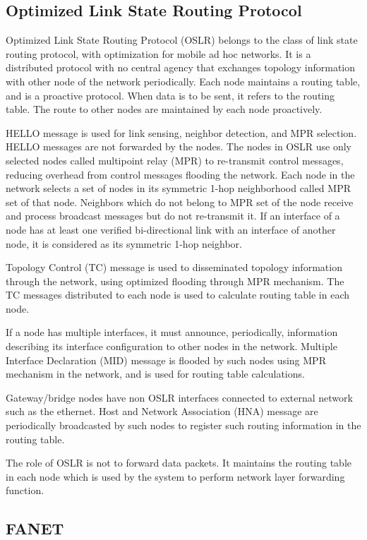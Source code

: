 \subsection{Optimized Link State Routing Protocol}

Optimized Link State Routing Protocol (OSLR) belongs to the class of link state routing protocol, with optimization for mobile ad hoc networks.  It is a distributed protocol with no central agency that exchanges topology information with other node of the network periodically. Each node maintains a routing table, and is a proactive protocol. When data is to be sent, it refers to the routing table. The route to other nodes are maintained by each node proactively. 

HELLO message is used for link sensing, neighbor detection, and MPR selection. HELLO messages are not forwarded by the nodes. The nodes in OSLR use only selected nodes called multipoint relay (MPR) to re-transmit control messages, reducing overhead from control messages flooding the network. Each node in the network selects a set of nodes in its symmetric 1-hop neighborhood called MPR set of that node. Neighbors which do not belong to MPR set of the node receive and process broadcast messages but do not re-transmit it. If an interface of a node has at least one verified bi-directional link with an interface of another node, it is considered as its symmetric 1-hop neighbor. 

Topology Control (TC) message is used to disseminated topology information through the network, using optimized flooding through MPR mechanism. The TC messages distributed to each node is used to calculate routing table in each node.

If a node has multiple interfaces, it must announce, periodically, information describing its interface configuration to other nodes in the network. Multiple Interface Declaration (MID) message is flooded by such nodes using MPR mechanism in the network, and is used for routing table calculations.

Gateway/bridge nodes have non OSLR interfaces connected to external network such as the ethernet. Host and Network Association (HNA) message are periodically broadcasted by such nodes to register such routing information in the routing table.


The role of OSLR is not to forward data packets. It maintains the routing table in each node which is used by the system to perform network layer forwarding function.

\subsection{FANET}

